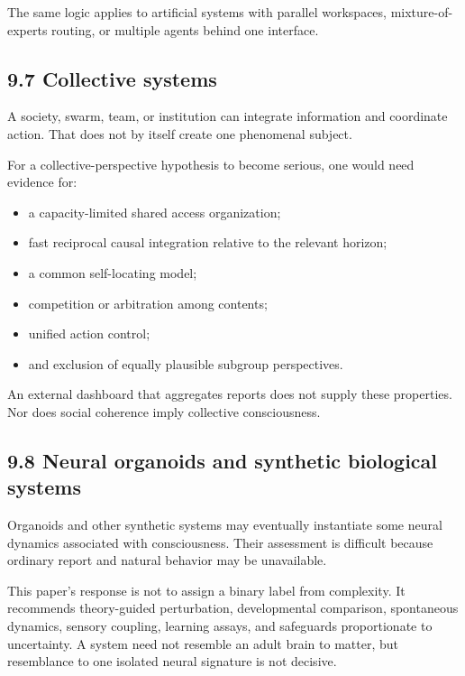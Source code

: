 \documentclass[
  11pt,
]{article}
\providecommand{\tightlist}{%
  \setlength{\itemsep}{0pt}\setlength{\parskip}{0pt}}
\begin{document}
The same logic applies to artificial systems with parallel workspaces,
mixture-of-experts routing, or multiple agents behind one interface.

\subsection{9.7 Collective systems}\label{collective-systems}

A society, swarm, team, or institution can integrate information and
coordinate action. That does not by itself create one phenomenal
subject.

For a collective-perspective hypothesis to become serious, one would
need evidence for:

\begin{itemize}
\tightlist
\item
  a capacity-limited shared access organization;
\item
  fast reciprocal causal integration relative to the relevant horizon;
\item
  a common self-locating model;
\item
  competition or arbitration among contents;
\item
  unified action control;
\item
  and exclusion of equally plausible subgroup perspectives.
\end{itemize}

An external dashboard that aggregates reports does not supply these
properties. Nor does social coherence imply collective consciousness.

\subsection{9.8 Neural organoids and synthetic biological
systems}\label{neural-organoids-and-synthetic-biological-systems}

Organoids and other synthetic systems may eventually instantiate some
neural dynamics associated with consciousness. Their assessment is
difficult because ordinary report and natural behavior may be
unavailable.

This paper's response is not to assign a binary label from complexity.
It recommends theory-guided perturbation, developmental comparison,
spontaneous dynamics, sensory coupling, learning assays, and safeguards
proportionate to uncertainty. A system need not resemble an adult brain
to matter, but resemblance to one isolated neural signature is not
decisive.
\end{document}
